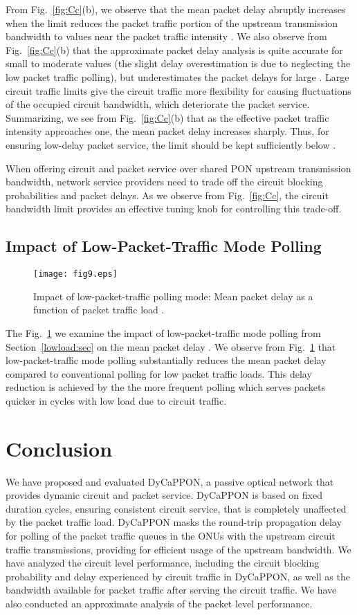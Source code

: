 \documentclass[article]{IEEEtran}
\begin{document}
From Fig.~\ref{fig:Cc}(b), we observe that the mean packet delay
abruptly increases when the  limit reduces the packet traffic
portion  of the upstream transmission bandwidth to values
near the packet traffic intensity . We also observe from
Fig.~\ref{fig:Cc}(b) that the approximate packet delay analysis is
quite accurate for small to moderate  values (the slight delay
overestimation is due to neglecting the low packet traffic polling),
but underestimates the packet delays for large . Large circuit
traffic limits  give the circuit traffic more flexibility for
causing fluctuations of the occupied circuit bandwidth, which
deteriorate the packet service. Summarizing, we see from
Fig.~\ref{fig:Cc}(b) that as the effective packet traffic intensity
 approaches one, the mean packet delay increases
sharply. Thus, for ensuring low-delay packet service, the limit
 should be kept sufficiently below .

When offering circuit and packet service over shared
PON upstream transmission bandwidth, network service providers need to
trade off the circuit blocking probabilities and packet delays.
As we observe from Fig.~\ref{fig:Cc}, the circuit bandwidth limit 
provides an effective tuning knob for controlling this trade-off.


\subsection{Impact of Low-Packet-Traffic Mode Polling}
\label{Lowtraffic:sec}
\begin{figure}[t]
\texttt{[image: fig9.eps]}
\caption{Impact of low-packet-traffic polling mode:
Mean packet delay  as a function of packet traffic load .
}
\label{fig:LM}
\end{figure}
The Fig.~\ref{fig:LM} we examine the impact of
low-packet-traffic mode polling from Section~\ref{lowload:sec}
on the mean packet delay .
We observe from Fig.~\ref{fig:LM} that low-packet-traffic mode
polling substantially reduces the mean packet delay
compared to conventional polling for low packet traffic loads.
This delay reduction is achieved by the
the more frequent polling which serves packets quicker in cycles with
low load due to circuit traffic.


\section{Conclusion}
\label{sec:conclusion}
We have proposed and evaluated DyCaPPON, a passive optical network
that provides dynamic circuit and packet service.
DyCaPPON is based on fixed duration cycles, ensuring
consistent circuit service, that is completely unaffected by
the packet traffic load.
DyCaPPON masks the round-trip propagation delay for
polling of the packet traffic queues in the ONUs with the
upstream circuit traffic transmissions, providing for efficient
usage of the upstream bandwidth.
We have analyzed the circuit level performance,
including the circuit blocking probability and delay
experienced by circuit traffic in DyCaPPON, as well as
the bandwidth available for packet traffic after serving the
circuit traffic.
We have also conducted an approximate analysis of
the packet level performance.
\end{document}

